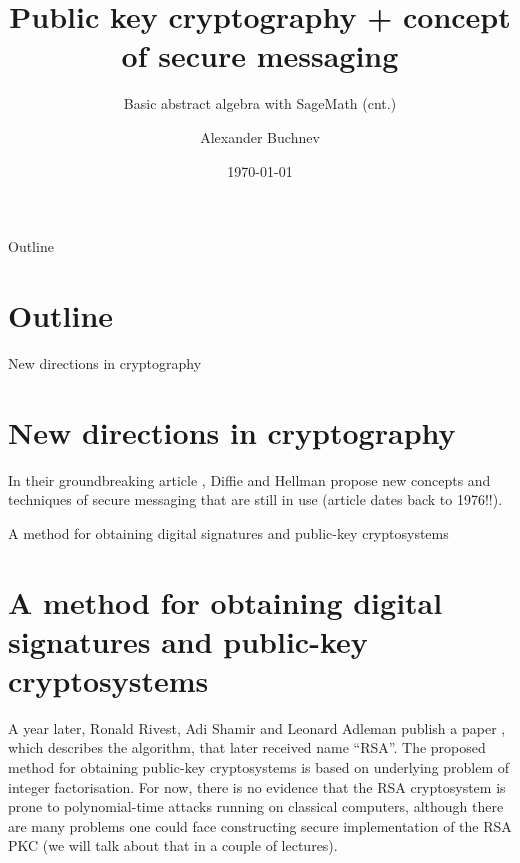 \documentclass{beamer}
\title{Public key cryptography + concept of secure messaging}
\subtitle{Basic abstract algebra with SageMath (cnt.)}
\author{Alexander Buchnev}
\date{\monthYear\today}
\begin{document}
\frame{
	\titlepage
}

\newtheorem{prop}{Proposition}


\begin{frame}{Outline}
    \section{Outline}
	\tableofcontents
\end{frame}

\begin{frame}{New directions in cryptography}
    \section{New directions in cryptography}
    In their groundbreaking article \cite{diffie-hellman:1976}, Diffie and Hellman propose new concepts and techniques
    of secure messaging that are still in use (article dates back to 1976!!).
\end{frame}

\begin{frame}{A method for obtaining digital signatures and public-key cryptosystems}
    \section{A method for obtaining digital signatures and public-key cryptosystems}
    A year later, Ronald Rivest, Adi Shamir and Leonard Adleman publish a paper \cite{rsa-1978}, which describes the algorithm, that
	later received name ``RSA''. The proposed method for obtaining public-key cryptosystems is based on underlying problem of integer
    factorisation. For now, there is no evidence that the RSA cryptosystem is prone to polynomial-time attacks running on classical
    computers, although there are many problems one could face constructing secure 
    implementation of the RSA PKC (we will talk about that in a couple of lectures).
\end{frame}
\end{document}
